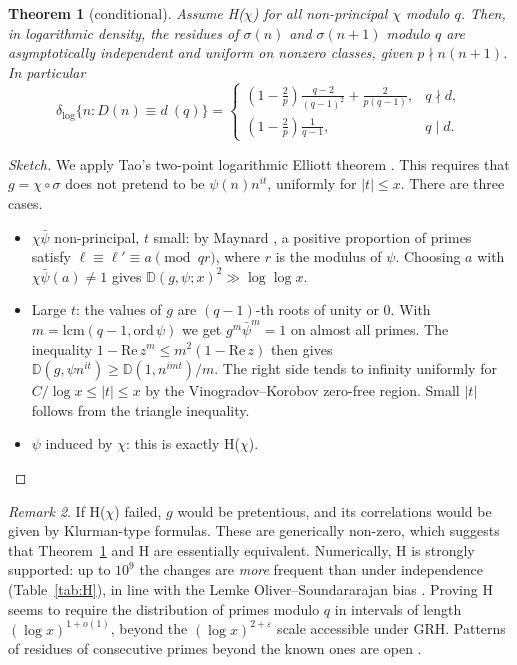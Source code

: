 \documentclass[11pt]{amsart}
\newtheorem{theorem}{Theorem}[section]
\theoremstyle{remark}
\newtheorem{remark}[theorem]{Remark}
\newcommand{\s}{\sigma}
\newcommand{\nx}[1]{#1'}
\begin{document}
\begin{theorem}[conditional]\label{thm:twopt}
Assume H($\chi$) for all non-principal $\chi$ modulo $q$. Then, in logarithmic density, the residues of $\s(n)$ and $\s(n+1)$ modulo $q$ are asymptotically independent and uniform on nonzero classes, given $p\nmid n(n+1)$. In particular
\[
\delta_{\log}\{n: D(n)\equiv d \ (q)\}=
\begin{cases}
\left(1-\frac2p\right)\frac{q-2}{(q-1)^2}+\frac{2}{p(q-1)}, & q\nmid d,\\[1mm]
\left(1-\frac2p\right)\frac{1}{q-1}, & q\mid d.
\end{cases}
\]
\end{theorem}
\begin{proof}[Sketch]
We apply Tao's two-point logarithmic Elliott theorem \cite{Tao}. This requires that $g=\chi\circ\s$ does not pretend to be $\psi(n)n^{it}$, uniformly for $|t|\le x$. There are three cases.
\begin{itemize}
\item $\chi\bar\psi$ non-principal, $t$ small: by Maynard \cite{Maynard}, a positive proportion of primes satisfy $\ell\equiv\nx\ell\equiv a\pmod{qr}$, where $r$ is the modulus of $\psi$. Choosing $a$ with $\chi\bar\psi(a)\ne1$ gives $\mathbb D(g,\psi;x)^2\gg\log\log x$.
\item Large $t$: the values of $g$ are $(q-1)$-th roots of unity or $0$. With $m=\mathrm{lcm}(q-1,\mathrm{ord}\,\psi)$ we get $g^m\bar\psi^m=1$ on almost all primes. The inequality $1-\mathrm{Re}\,z^m\le m^2(1-\mathrm{Re}\,z)$ then gives $\mathbb D(g,\psi n^{it})\ge \mathbb D(1,n^{imt})/m$. The right side tends to infinity uniformly for $C/\log x\le|t|\le x$ by the Vinogradov--Korobov zero-free region. Small $|t|$ follows from the triangle inequality.
\item $\psi$ induced by $\chi$: this is exactly H($\chi$).
\end{itemize}
\end{proof}

\begin{remark}
If H($\chi$) failed, $g$ would be pretentious, and its correlations would be given by Klurman-type formulas. These are generically non-zero, which suggests that Theorem~\ref{thm:twopt} and H are essentially equivalent. Numerically, H is strongly supported: up to $10^9$ the changes are \emph{more} frequent than under independence (Table~\ref{tab:H}), in line with the Lemke Oliver--Soundararajan bias \cite{LOS}. Proving H seems to require the distribution of primes modulo $q$ in intervals of length $(\log x)^{1+o(1)}$, beyond the $(\log x)^{2+\varepsilon}$ scale accessible under GRH. Patterns of residues of consecutive primes beyond the known ones are open \cite{Lau}.
\end{remark}
\end{document}
